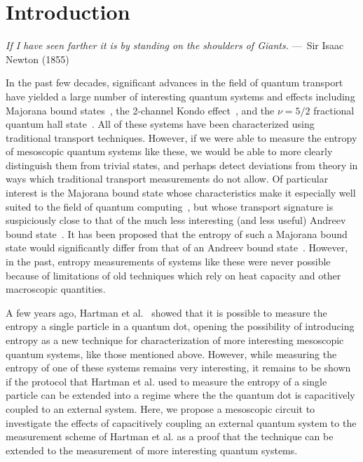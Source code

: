 
\chapter{Introduction}
\label{ch:Introduction}

\begin{epigraph}
    \emph{If I have seen farther it is by standing on the shoulders of
    Giants.} ---~Sir Isaac Newton (1855)
\end{epigraph}

In the past few decades, significant advances in the field of quantum transport have yielded a large number of interesting quantum systems and effects including Majorana bound states~\cite{frolovmajorana}, the 2-channel Kondo effect~\cite{goldhaber-2ck}, and the $\nu = 5/2$ fractional quantum hall state~\cite{Eisenstein5_2}. All of these systems have been characterized using traditional transport techniques. However, if we were able to measure the entropy of mesoscopic quantum systems like these, we would be able to more clearly distinguish them from trivial states, and perhaps detect deviations from theory in ways which traditional transport measurements do not allow. Of particular interest is the Majorana bound state whose characteristics make it especially well suited to the field of quantum computing~\cite{simon, kitaev}, but whose transport signature is suspiciously close to that of the much less interesting (and less useful) Andreev bound state~\cite{frolov_mirage}. It has been proposed that the entropy of such a Majorana bound state would significantly differ from that of an Andreev bound state~\cite{majorana_fractional}. However, in the past, entropy measurements of systems like these were never possible because of limitations of old techniques which rely on heat capacity and other macroscopic quantities.

A few years ago, Hartman et al.~\cite{nikentropy} showed that it is possible to measure the entropy a single \spinh particle in a quantum dot, opening the possibility of introducing entropy as a new technique for characterization of more interesting mesoscopic quantum systems, like those mentioned above.  However, while measuring the entropy of one of these systems remains very interesting, it remains to be shown if the protocol that Hartman et al. used to measure the entropy of a single \spinh particle can be extended into a regime where the the quantum dot is capacitively coupled to an external system. Here, we propose a mesoscopic circuit to investigate the effects of capacitively coupling an external quantum system to the measurement scheme of Hartman et al. as a proof that the technique can be extended to the measurement of more interesting quantum systems.
\endinput

Any text after an \endinput is ignored.
You could put scraps here or things in progress.
